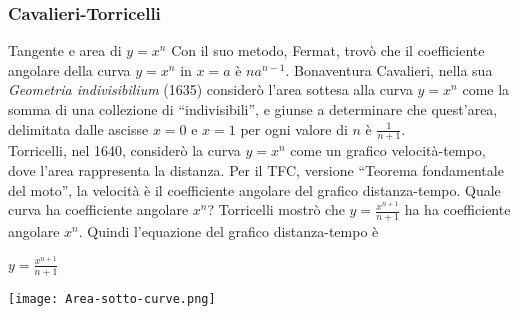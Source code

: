 \begin{frame}[label=Cavalieri-Torricelli]
    \frametitle{Cavalieri-Torricelli}
    \begin{block}{Tangente e area di $y = x^n$}
        Con il suo metodo, Fermat, trovò che il coefficiente angolare della curva $y = x^n$
        in $x=a$ è $na^{n-1}$. Bonaventura Cavalieri, nella sua \textit{Geometria indivisibilium} (1635)
        considerò l'area sottesa alla curva $y= x^n$ come la somma di una collezione di ``indivisibili'',
        e giunse a determinare che quest'area, delimitata dalle ascisse
        $x=0$ e $x=1$ per ogni valore di $n$ è $\frac{1}{n+1}$.
        \\
        Torricelli, nel 1640, considerò la curva $y = x^n$ come un grafico velocità-tempo,
        dove l'area rappresenta la distanza.
        Per il \alert{TFC}, versione ``Teorema fondamentale del moto'', la velocità è il 
        coefficiente angolare del grafico distanza-tempo. Quale curva ha coefficiente angolare
        $x^n$?  Torricelli mostrò che $y = \frac{x^{n+1}}{n+1}$ ha ha coefficiente angolare
        $x^n$. Quindi l'equazione del grafico distanza-tempo è 
        \begin{center}
            $y = \frac{x^{n+1}}{n+1}$
        \end{center}
        \begin{center}
        \texttt{[image: Area-sotto-curve.png]}
        \end{center}
    \end{block}
\end{frame}
